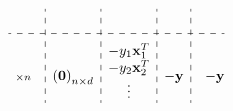 \documentclass{article}
\begin{document}
\[\begin{array}{rl@{}:cccc:cccc:c:@{}r r@{}c@{}l}
                                                  &                                                                                            & \multicolumn{4}{c:}{}                                         & \multicolumn{4}{c:}{}                                      & \multicolumn{1}{c:}{                              } &                                                                                            &                                                                                            & \\
                                                  &                                                                                            & \multicolumn{4}{c:}{}                                         & \multicolumn{4}{c:}{}                                      & \multicolumn{1}{c:}{                              } &                                                                                            &                                                                                            & \\
        \hdashline
        \rule{0pt}{1.5em}
        \multirow{4}{*}{$\scriptstyle{\times n}$} &                                                                                            & \multicolumn{4}{c:}{\multirow{4}{*}{$\mathbf {(0)}_{n\times d}$}} & \multicolumn{4}{c:}{\multirow{1}{*}{$-y_1 \mathbf x_1^T$}} & \multicolumn{1}{c:}{\multirow{4}{*}{$-\mathbf y$}}  &                                                                                            &                                                                                            & \multirow{4}{*}{$-\mathbf y$}\\
                                                  &                                                                                            & \multicolumn{4}{c:}{}                                         & \multicolumn{4}{c:}{\multirow{1}{*}{$-y_2 \mathbf x_2^T$}} & \multicolumn{1}{c:}{}                               &                                                                                            &                                                                                            &                              \\
                                                  &                                                                                            & \multicolumn{4}{c:}{}                                         & \multicolumn{4}{c:}{\vdots}                                & \multicolumn{1}{c:}{}                               &                                                                                            &                                                                                            &                              \\

\end{array}\]
\end{document}
